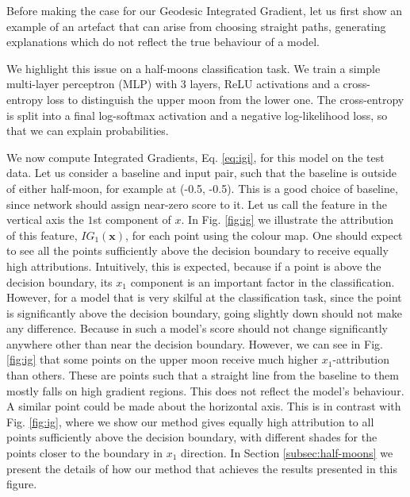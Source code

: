 Before making the case for our Geodesic Integrated Gradient, let us first show an example of an artefact that can arise from choosing straight paths, generating explanations which do not reflect the true behaviour of a model. 

We highlight this issue on a half-moons classification task. We train a simple multi-layer perceptron (MLP) with 3 layers, ReLU activations and a cross-entropy loss to distinguish the upper moon from the lower one. The cross-entropy is split into a final log-softmax activation and a negative log-likelihood loss, so that we can explain probabilities.

We now compute Integrated Gradients, Eq. \ref{eq:igi}, for this model on the test data. Let us consider a baseline and input pair, such that the baseline is outside of either half-moon, for example at (-0.5, -0.5). This is a good choice of baseline, since network should assign near-zero score to it. Let us call the feature in the vertical axis the $1$st component of $x$. In Fig. \ref{fig:ig} we illustrate the attribution of this feature, $IG_1(\textbf{x})$, for each point using the colour map. One should expect to see all the points sufficiently above the decision boundary to receive equally high attributions. Intuitively, this is expected, because if a point is above the decision boundary, its $x_1$ component is an important factor in the classification. However, for a model that is very skilful at the classification task, since the point is significantly above the decision boundary, going slightly down should not make any difference. Because in such a model's score should not change significantly anywhere other than near the decision boundary. However, we can see in Fig. \ref{fig:ig} that some points on the upper moon receive much higher $x_1$-attribution than others. These are points such that a straight line from the baseline to them mostly falls on high gradient regions. This does not reflect the model's behaviour. A similar point could be made about the horizontal axis. This is in contrast with Fig. \ref{fig:ig}, where we show our method gives equally high attribution to all points sufficiently above the decision boundary, with different shades for the points closer to the boundary in $x_1$ direction. In Section \ref{subsec:half-moons} we present the details of how our method that achieves the results presented in this figure.

